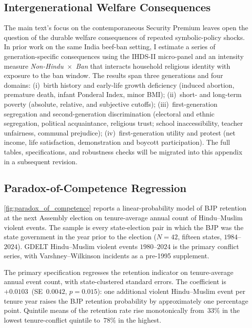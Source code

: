 \subsection{Intergenerational Welfare Consequences} \label{app:intergenerational}

The main text's focus on the contemporaneous Security Premium leaves open the
question of the durable welfare consequences of repeated symbolic-policy
shocks. In prior work on the same India beef-ban setting, I estimate a series
of generation-specific consequences using the IHDS-II micro-panel and an
intensity measure \textit{Non-Hindu~$\times$~Ban} that interacts household
religious identity with exposure to the ban window. The results span three
generations and four domains: (i)~birth history and early-life growth
deficiency (induced abortion, premature death, infant Ponderal Index, minor
BMI); (ii)~short- and long-term poverty (absolute, relative, and subjective
cutoffs); (iii)~first-generation segregation and second-generation
discrimination (electoral and ethnic segregation, political acquaintance,
religious trust; school inaccessibility, teacher unfairness, communal
prejudice); (iv)~first-generation utility and protest (net income, life
satisfaction, demonstration and boycott participation). The full tables,
specifications, and robustness checks will be migrated into this appendix in a subsequent revision.

\subsection{Paradox-of-Competence Regression}\label{app:paradox_regression}

\autoref{fig:paradox_of_competence} reports a linear-probability model of
BJP retention at the next Assembly election on tenure-average annual count
of Hindu--Muslim violent events. The sample is every state-election pair in
which the BJP was the state government in the year prior to the election
($N=42$, fifteen states, $1984$--$2024$). GDELT Hindu--Muslim violent
events $1980$--$2024$ is the primary conflict series, with
Varshney--Wilkinson incidents as a pre-1995 supplement.

The primary specification regresses the retention indicator on
tenure-average annual event count, with state-clustered standard
errors. The coefficient is~$+0.0103$~(SE~$0.0042$, $p=0.015$): one
additional violent Hindu--Muslim event per tenure year raises the BJP
retention probability by approximately one percentage point. Quintile
means of the retention rate rise monotonically from~$33\%$ in the lowest
tenure-conflict quintile to~$78\%$ in the highest.

